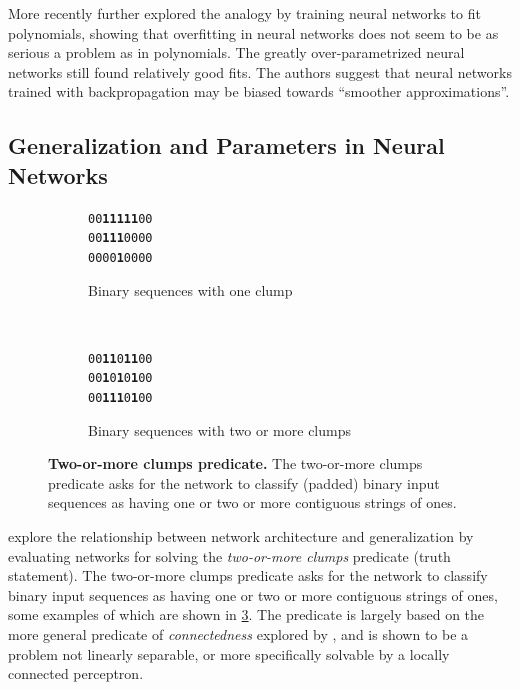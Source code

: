 \documentclass[thesis]{subfiles}
\begin{document}
    More recently \citet{caruana2001overfitting} further explored the analogy by training neural networks to fit polynomials, showing that overfitting in neural networks does not seem to be as serious a problem as in polynomials. The greatly over-parametrized neural networks still found relatively good fits. The authors suggest that neural networks trained with backpropagation may be biased towards ``smoother approximations''.
	
	
	\subsection{Generalization and Parameters in Neural Networks}
	\begin{figure}[tb]
		\centering
		\large
        \renewcommand{\ttdefault}{pcr}
		\begin{subfigure}[t]{0.45\textwidth}
			\begin{center}
			\texttt{00\textbf{11111}00}\\
			\texttt{00\textbf{111}0000}\\
			\texttt{0000\textbf{1}0000}
			\end{center}
			\caption{Binary sequences with one clump}
			\label{fig:oneclump}
		\end{subfigure}
		~
		\begin{subfigure}[t]{0.45\textwidth}
			\begin{center}
			\texttt{00\textbf{11}0\textbf{11}00}\\
			\texttt{00\textbf{1}0\textbf{1}0\textbf{1}00}\\
			\texttt{00\textbf{111}0\textbf{1}00}
			\end{center}
			\caption{Binary sequences with two or more clumps}
			\label{fig:twoclumps}
		\end{subfigure}
		
		\caption[Two-or-more clumps predicate.]{\textbf{Two-or-more clumps predicate.} The two-or-more clumps predicate asks for the network to classify (padded) binary input sequences as having one or two or more contiguous strings of ones.}
		\label{fig:tomclumps}
	\end{figure}
	
	\citet{denker1987large,giles1987learning} explore the relationship between network architecture and generalization by evaluating networks for solving the \emph{two-or-more clumps} predicate (truth statement). The two-or-more clumps predicate asks for the network to classify binary input sequences as having one or two or more contiguous strings of ones, some examples of which are shown in \cref{fig:tomclumps}. The predicate is largely based on the more general predicate of \emph{connectedness} explored by \citet{minsky1988perceptrons}, and is shown to be a problem not linearly separable, or more specifically solvable by a locally connected perceptron. 
	
\end{document}
